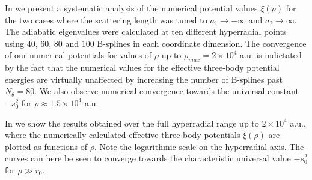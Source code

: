 In  we present a systematic analysis of the numerical potential values $\xi(\rho)$ for the two cases where the scattering length was tuned to $a_1 \rightarrow -\infty$ and $a_2 \rightarrow \infty$. The adiabatic eigenvalues were calculated at ten different hyperradial points using $40$, $60$, $80$ and $100$ B-splines in each coordinate dimension. The convergence of our numerical potentials for values of $\rho$ up to $\rho_{max} = 2 \times 10^4$ a.u. is indictated by the fact that the numerical values for the effective three-body potential energies are virtually unaffected by increasing the number of B-splines past $N_{\theta}=80$. We also observe numerical convergence towards the universal constant $-s_0^2$ for $\rho \approx 1.5 \times 10^4$ a.u. 

In  we show the results obtained over the full hyperradial range up to $2 \times 10^4$ a.u., where the numerically calculated effective three-body potentials $\xi(\rho)$ are plotted as functions of $\rho$. Note the logarithmic scale on the hyperradial axis. The curves can here be seen to converge towards the characteristic universal value $-s_0^2$ for $\rho \gg r_0$. 


